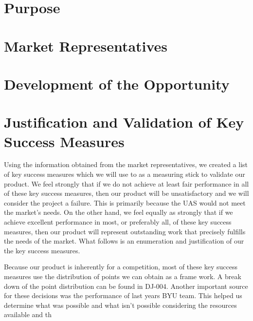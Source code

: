 \documentclass[]{auvsi_doc}
\begin{document}
\CapstoneTitlePage

\section{Purpose}
\section{Market Representatives}
\section{Development of the Opportunity}
\section{Justification and Validation of Key Success Measures}
Using the information obtained from the market representatives, we created a list of key success measures which we will use to as a measuring stick to validate our product. We feel strongly that if we do not achieve at least fair performance in all of these key success measures, then our product will be unsatisfactory and we will consider the project a failure. This is primarily because the UAS would not meet the market's needs. On the other hand, we feel equally as strongly that if we achieve excellent performance in most, or preferably all, of these key success measures, then our product will represent outstanding work that precisely fulfills the needs of the market. What follows is an enumeration and justification of our the key success measures. 

Because our product is inherently for a competition, most of these key success measures use the distribution of points we can obtain as a frame work. A break down of the point distribution can be found in DJ-004. Another important source for these decisions was the performance of last years BYU team. This helped us determine what was possible and what isn't possible considering the resources available and th
\end{document}
